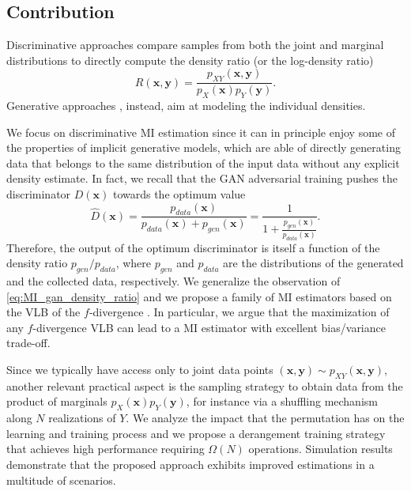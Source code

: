 \subsection{Contribution}
\label{subsec:mi_contribution}
Discriminative approaches \cite{raina2003classification, tonello2022mind} compare samples from both the joint and marginal distributions to directly compute the density ratio (or the log-density ratio) 
\begin{equation}
R(\mathbf{x},\mathbf{y}) = \frac{p_{XY}(\mathbf{x},\mathbf{y})}{p_X(\mathbf{x}) p_Y(\mathbf{y})}
\label{eq:MI_density_ratio_1}.
\end{equation}
Generative approaches \cite{Barber2003, song2019generative}, instead, aim at modeling the individual densities. 

We focus on discriminative MI estimation since it can in principle enjoy some of the properties of implicit generative models, which are able of directly generating data that belongs to the same distribution of the input data without any explicit density estimate. In fact, we recall that the GAN adversarial training pushes the discriminator $D(\mathbf{x})$ towards the optimum value
\begin{equation}
\label{eq:MI_gan_density_ratio}
\hat{D}(\mathbf{x}) = \frac{p_{data}(\mathbf{x})}{p_{data}(\mathbf{x})+p_{gen}(\mathbf{x})} = \frac{1}{1+\frac{p_{gen}(\mathbf{x})}{p_{data}(\mathbf{x})}}.
\end{equation}
Therefore, the output of the optimum discriminator is itself a function of the density ratio $p_{gen}/p_{data}$, where $p_{gen}$ and $p_{data}$ are the distributions of the generated and the collected data, respectively.
We generalize the observation of \eqref{eq:MI_gan_density_ratio} and we propose a family of MI estimators based on the VLB of the $f$-divergence \cite{Poole2019, sason2016f}. In particular, we argue that the maximization of any $f$-divergence VLB can lead to a MI estimator with excellent bias/variance trade-off.

Since we typically have access only to joint data points $(\mathbf{x},\mathbf{y}) \sim p_{XY}(\mathbf{x},\mathbf{y})$, another relevant practical aspect is the sampling strategy to obtain data from the product of marginals $p_{X}(\mathbf{x})p_Y(\mathbf{y})$, for instance via a shuffling mechanism along $N$ realizations of $Y$. We analyze the impact that the permutation has on the learning and training process and we propose a derangement training strategy that achieves high performance requiring $\Omega(N)$ operations.
Simulation results demonstrate that the proposed approach exhibits improved estimations in a multitude of scenarios.

